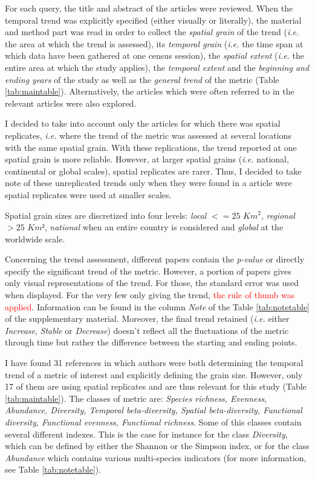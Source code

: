 \documentclass[
  12pt,
  oneside]{report}
\begin{document}
For each query, the title and abstract of the articles were reviewed. When the temporal trend was explicitly specified (either visually or literally), the material and method part was read in order to collect the \emph{spatial grain} of the trend (\emph{i.e.} the area at which the trend is assessed), its \emph{temporal grain} (\emph{i.e.} the time span at which data have been gathered at one census session), the \emph{spatial extent} (\emph{i.e.} the entire area at which the study applies), the \emph{temporal extent} and the \emph{beginning and ending years} of the study as well as the \emph{general trend} of the metric (Table \ref{tab:maintable}). Alternatively, the articles which were often referred to in the relevant articles were also explored.

I decided to take into account only the articles for which there was spatial replicates, \emph{i.e.} where the trend of the metric was assessed at several locations with the same spatial grain. With these replications, the trend reported at one spatial grain is more reliable. However, at larger spatial grains (\emph{i.e.} national, continental or global scales), spatial replicates are rarer. Thus, I decided to take note of these unreplicated trends only when they were found in a article were spatial replicates were used at smaller scales.

Spatial grain sizes are discretized into four levels: \emph{local} \(<= 25\) \(Km^2\), \emph{regional} \(> 25\) \(Km²\), \emph{national} when an entire country is considered and \emph{global} at the worldwide scale.

Concerning the trend assessment, different papers contain the \emph{p-value} or directly specify the significant trend of the metric. However, a portion of papers gives only visual representations of the trend. For those, the standard error was used when displayed. For the very few only giving the trend, \textcolor{red}{the rule of thumb was applied}. Information can be found in the column \emph{Note} of the Table \ref{tab:notetable} of the supplementary material. Moreover, the final trend retained (\emph{i.e.} either \emph{Increase}, \emph{Stable} or \emph{Decrease}) doesn't reflect all the fluctuations of the metric through time but rather the difference between the starting and ending points.

I have found 31 references in which authors were both determining the temporal trend of a metric of interest and explicitly defining the grain size. However, only 17 of them are using spatial replicates and are thus relevant for this study (Table \ref{tab:maintable}). The classes of metric are: \emph{Species richness, Evenness, Abundance, Diversity, Temporal beta-diversity, Spatial beta-diversity, Functional diversity, Functional evenness, Functional richness}. Some of this classes contain several different indexes. This is the case for instance for the class \emph{Diversity}, which can be defined by either the Shannon or the Simpson index, or for the class \emph{Abundance} which contains various multi-species indicators (for more information, see Table \ref{tab:notetable}).
\end{document}
